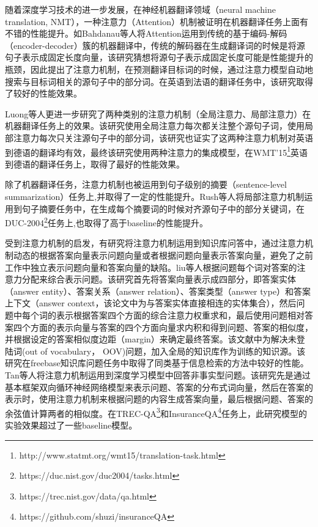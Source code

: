 随着深度学习技术的进一步发展，在神经机器翻译领域（neural machine translation, NMT），一种注意力（Attention）机制被证明在机器翻译任务上面有不错的性能提升。如Bahdanau\cite{Bahdanau}等人将Attention运用到传统的基于编码-解码（encoder-decoder）簇的机器翻译中，传统的解码器在生成翻译词的时候是将源句子表示成固定长度向量，该研究猜想将源句子表示成固定长度可能是性能提升的瓶颈，因此提出了注意力机制，在预测翻译目标词的时候，通过注意力模型自动地搜索与目标词相关的源句子中的部分词。在英语到法语的翻译任务中，该研究取得了较好的性能效果。

Luong\cite{Luong}等人更进一步研究了两种类别的注意力机制（全局注意力、局部注意力）在机器翻译任务上的效果。该研究使用全局注意力每次都关注整个源句子词，使用局部注意力每次只关注源句子中的部分词，该研究也证实了这两种注意力机制对英语到德语的翻译均有效，最终该研究使用两种注意力的集成模型，在WMT'15\footnote{http://www.statmt.org/wmt15/translation-task.html}英语到德语的翻译任务上，取得了最好的性能效果。

除了机器翻译任务，注意力机制也被运用到句子级别的摘要（sentence-level summarization）任务上,并取得了一定的性能提升。Rush\cite{Rush}等人将局部注意力机制运用到句子摘要任务中，在生成每个摘要词的时候对齐源句子中的部分关键词，在DUC-2004\footnote{https://duc.nist.gov/duc2004/tasks.html}任务上,也取得了高于baseline的性能提升。

受到注意力机制的启发，有研究将注意力机制运用到知识库问答中，通过注意力机制动态的根据答案向量表示问题向量或者根据问题向量表示答案向量，避免了之前工作中独立表示问题向量和答案向量的缺陷。liu\cite{Liu}等人根据问题每个词对答案的注意力分配来综合表示问题。该研究首先将答案向量表示成四部分，即答案实体（answer entity）、答案关系（answer relation）、答案类型（answer type）和答案上下文（answer context，该论文中为与答案实体直接相连的实体集合），然后问题中每个词的表示根据答案四个方面的综合注意力权重求和，最后使用问题相对答案四个方面的表示向量与答案的四个方面向量求内积和得到问题、答案的相似度，并根据设定的答案相似度边距（margin）来确定最终答案。该文献中为解决未登陆词(out of vocabulary， OOV)问题，加入全局的知识库作为训练的知识源。该研究在freebase知识库问题任务中取得了同类基于信息检索的方法中较好的性能。Tan\cite{Tan}等人将注意力机制运用到深度学习模型中回答非事实型问题。该研究先是通过基本框架双向循环神经网络模型来表示问题、答案的分布式词向量，然后在答案的表示时，使用注意力机制来根据问题的内容生成答案向量，最后根据问题、答案的余弦值计算两者的相似度。在TREC-QA\footnote{https://trec.nist.gov/data/qa.html}和InsuranceQA\footnote{https://github.com/shuzi/insuranceQA}任务上，此研究模型的实验效果超过了一些baseline模型。

